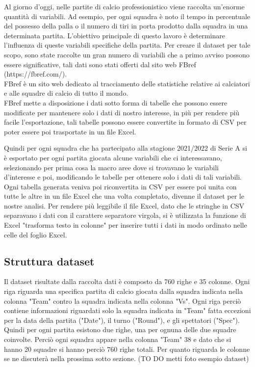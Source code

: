 Al giorno d'oggi, nelle partite di calcio professionistico viene raccolta un'enorme quantità di variabili. Ad esempio, per ogni squadra è noto il tempo in percentuale del possesso della palla o il numero di tiri in porta prodotto dalla squadra in una determinata partita. L'obiettivo principale di questo lavoro è determinare l'influenza di queste variabili specifiche della partita. Per creare il dataset per tale scopo, sono state raccolte un gran numero di variabili che a primo avviso possono essere significative, tali dati sono stati offerti dal sito web FBref (https://fbref.com/).\\ FBref è un sito web dedicato al tracciamento delle statistiche relative ai calciatori e alle squadre di calcio di tutto il mondo. \\

FBref mette a disposizione i dati sotto forma di tabelle che possono essere modificate per mantenere solo i dati di nostro interesse, in più per rendere più facile l'esportazione, tali tabelle possono essere convertite in formato di CSV per poter essere poi trasportate in un file Excel. 

Quindi per ogni squadra che ha partecipato alla stagione 2021/2022 di Serie A si è esportato per ogni partita giocata alcune variabili che ci interessavano, selezionando per prima cosa la macro aree dove si trovavano le variabili d'interesse e poi, modificando le tabelle per ottenere solo i dati di tali variabili. Ogni tabella generata veniva poi riconvertita in CSV per essere poi unita con tutte le altre in un file Excel che una volta completato, divenne il dataset per le nostre analisi. Per rendere più leggibile il file Excel, dato che le stringhe in CSV separavano i dati con il carattere separatore virgola, si è utilizzata la funzione di Excel "trasforma testo in colonne" per inserire tutti i dati in modo ordinato nelle celle del foglio Excel.

\subsection{Struttura dataset}
Il dataset risultate dalla raccolta dati è composto da 760 righe e 35 colonne. Ogni riga riguarda una specifica partita di calcio giocata dalla squadra indicata nella colonna "Team" contro la squadra indicata nella colonna "Vs". Ogni riga perciò contiene informazioni riguardati solo la squadra indicata in "Team" fatta eccezioni per la data della partita ("Date"), il turno ("Round"), e gli spettatori ("Spec"). Quindi per ogni partita esistono due righe, una per ognuna delle due squadre coinvolte. Perciò ogni squadra appare nella colonna "Team" 38 e dato che si hanno 20 squadre si hanno perciò 760 righe totali. Per quanto riguarda le colonne se ne discuterà nella prossima sotto sezione. (TO DO metti foto esempio dataset)

